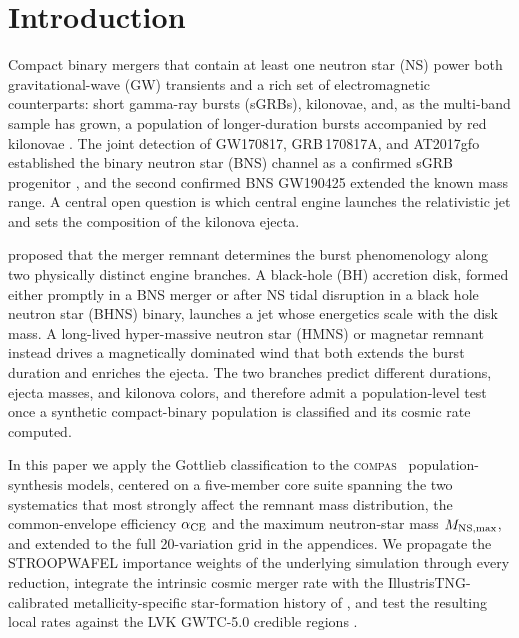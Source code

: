 \documentclass[twocolumn,amsmath]{aastex702}
\newcommand{\compas}{\textsc{compas}}
\begin{document}

\section{Introduction} \label{sec:intro}

Compact binary mergers that contain at least one neutron star (NS) power both
gravitational-wave (GW) transients and a rich set of electromagnetic
counterparts: short gamma-ray bursts (sGRBs), kilonovae, and, as the multi-band
sample has grown, a population of longer-duration bursts accompanied by red
kilonovae \citep{rastinejad2024,levan2024}. The joint detection of GW170817,
GRB\,170817A, and AT2017gfo established the binary neutron star (BNS) channel as
a confirmed sGRB progenitor \citep{abbott2019gw170817,goldstein2017,kasen2017},
and the second confirmed BNS GW190425 \citep{abbott2020gw190425} extended the
known mass range. A central open question is which central engine launches the
relativistic jet and sets the composition of the kilonova ejecta.

\citet{gottlieb2023,gottlieb2024} proposed that the merger remnant determines
the burst phenomenology along two physically distinct engine branches. A
black-hole (BH) accretion disk, formed either promptly in a BNS merger or after
NS tidal disruption in a black hole neutron star (BHNS) binary, launches a jet
whose energetics scale with the disk mass. A long-lived hyper-massive neutron
star (HMNS) or magnetar remnant instead drives a magnetically dominated wind
that both extends the burst duration and enriches the ejecta. The two branches
predict different durations, ejecta masses, and kilonova colors, and therefore
admit a population-level test once a synthetic compact-binary population is
classified and its cosmic rate computed.

In this paper we apply the Gottlieb classification to the \compas\
\citep{broekgaarden2021} population-synthesis models, centered on a five-member
core suite spanning the two systematics that most strongly affect the remnant
mass distribution, the common-envelope efficiency $\alpha_{\rm CE}$ and the
maximum neutron-star mass $M_{\rm NS,max}$, and extended to the full
20-variation grid in the appendices. We propagate the STROOPWAFEL importance
weights of the underlying simulation through every reduction, integrate the
intrinsic cosmic merger rate with the IllustrisTNG-calibrated metallicity-specific
star-formation history of \citet{levina2026}, and test the resulting local
rates against the LVK GWTC-5.0 credible regions \citep{abac2026}.
\end{document}
